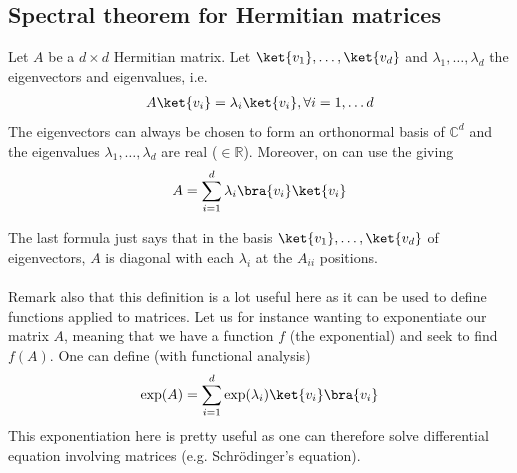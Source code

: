 \subsection{Spectral theorem for Hermitian matrices}
Let $A$ be a $d \times d$ Hermitian matrix. Let $\ket{v_1}, \ldots, \ket{v_d}$ and $\lambda_1, \ldots, \lambda_d$ the eigenvectors and eigenvalues, i.e.
\begin{align*} 
	A \ket{v_i} = \lambda_i \ket{v_i} , \forall i = 1, \ldots d 
\end{align*}
The eigenvectors can always be chosen to form an orthonormal basis of $\mathbb{C}^{d}$ and the eigenvalues $\lambda_1, \ldots, \lambda_d$ are real ($\in \mathbb{R}$). Moreover, on can use the  giving 
\begin{align*}
	A = \sum_{i= 1}^{d} \lambda_i \bra{v_i}\ket{v_i} 
\end{align*}
\begin{framedremark}
The last formula just says that in the basis $\ket{v_1}, \ldots, \ket{v_d}$ of eigenvectors, $A$ is diagonal with each $\lambda_i$ at the $A_{ii}$ positions.\\
$ $\\
Remark also that this definition is a lot useful here as it can be used to define functions applied to matrices. Let us for instance wanting to exponentiate our matrix $A$, meaning that we have a function $f$ (the exponential) and seek to find $f\left(A\right)$. One can define (with functional analysis) 
\begin{align*} 
	\exp\left(A\right) = \sum_{i= 1}^{d}\exp\left(\lambda_i\right) \ket{v_i}\bra{v_i} 
\end{align*}
This exponentiation here is pretty useful as one can therefore solve differential equation involving matrices (e.g. Schrödinger's equation).
\end{framedremark}

